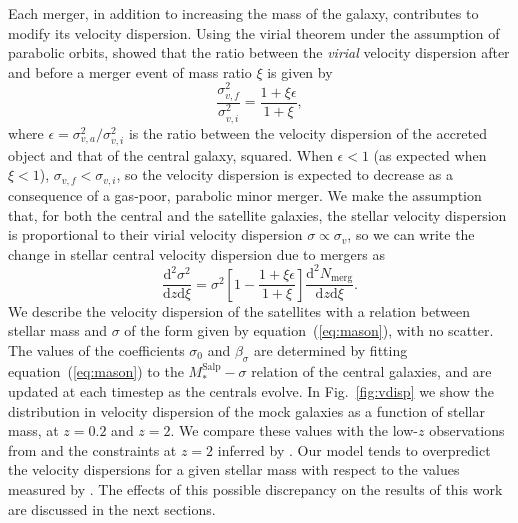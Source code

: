 \documentclass[usenatbib]{mnras}
\def\msalp{M_*^{\mathrm{Salp}}}
\def\Fref#1{Fig.~\ref{#1}\xspace}
\def\Eref#1{equation~(\ref{#1})\xspace}
\begin{document}
Each merger, in addition to increasing the mass of the galaxy,
contributes to modify its velocity dispersion. Using the virial
theorem under the assumption of parabolic orbits, \citet{NJO09} showed
that the ratio between the {\em virial} velocity dispersion after and
before a merger event of mass ratio $\xi$ is given by
\begin{equation}
\frac{\sigma_{v,f}^2}{\sigma_{v,i}^2} = \frac{1 + \xi\epsilon}{1 + \xi},
\end{equation}
where $\epsilon = \sigma_{v,a}^2/\sigma_{v,i}^2$ is the ratio between
the velocity dispersion of the accreted object and that of the central
galaxy, squared.  When $\epsilon<1$ (as expected when $\xi<1$),
  $\sigma_{v,f}<\sigma_{v,i}$, so the velocity dispersion is expected
  to decrease as a consequence of a gas-poor, parabolic minor
  merger. We make the assumption that, for both the central and the
  satellite galaxies, the stellar velocity dispersion is proportional
  to their virial velocity dispersion $\sigma \propto \sigma_v$, so we
  can write the change in stellar central velocity dispersion due to
  mergers as
\begin{equation}
\frac{\mathrm{d}^2\sigma^2}{\mathrm{d}z\mathrm{d}\xi} = \sigma^2\left[1-\frac{1 + \xi\epsilon}{1 + \xi}\right]\frac{\mathrm{d}^2N_{\mathrm{merg}}}{\mathrm{d}z \mathrm{d}\xi}.
\end{equation}
We
describe the velocity dispersion of the satellites with a relation
between stellar mass and $\sigma$ of the form given by
\Eref{eq:mason}, with no scatter. The values of the coefficients
$\sigma_0$ and $\beta_\sigma$ are determined by fitting
\Eref{eq:mason} to the $\msalp-\sigma$ relation of the central
galaxies, and are updated at each timestep as the centrals evolve.  In
\Fref{fig:vdisp} we show the distribution in velocity dispersion of
the mock galaxies as a function of stellar mass, at $z=0.2$ and
$z=2$. We compare these values with the low-$z$ observations from
\citet{Aug++10} and the constraints at $z=2$ inferred by
\citet{Mas++15}. Our model tends to overpredict the velocity
  dispersions for a given stellar mass with respect to the values
  measured by \citet{Mas++15}. The effects of this possible
discrepancy on the results of this work are discussed in the next 
sections.
%
\end{document}
